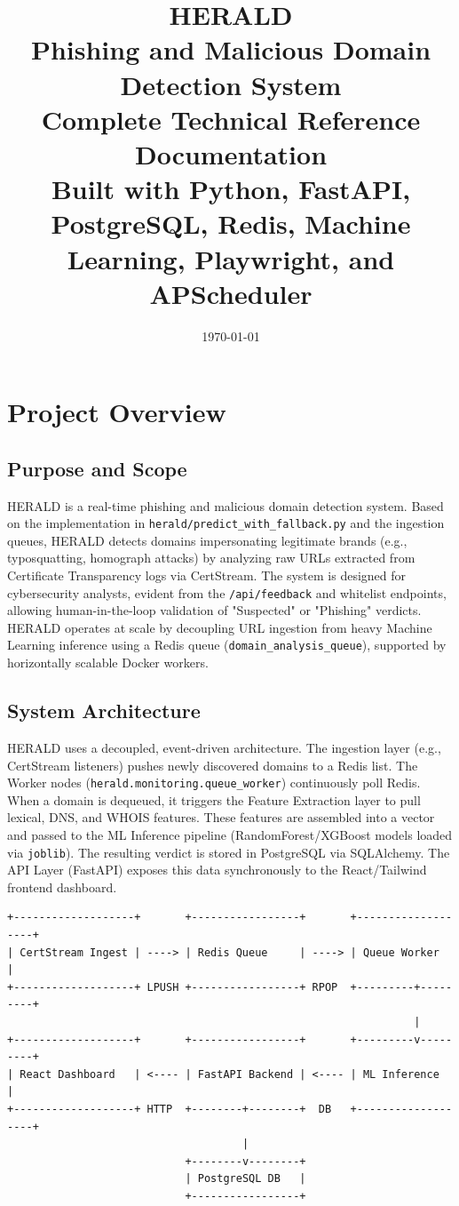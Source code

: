 \documentclass[12pt,a4paper]{report}
\title{
  \vspace{2cm}
  \textbf{\Huge HERALD} \\
  \vspace{0.5cm}
  \Large Phishing and Malicious Domain Detection System \\
  \vspace{0.3cm}
  \large Complete Technical Reference Documentation \\
  \vspace{1cm}
  \normalsize Built with Python, FastAPI, PostgreSQL, Redis,
  Machine Learning, Playwright, and APScheduler
}
\date{\today}
\begin{document}
\maketitle
\newpage
\tableofcontents
\newpage

\chapter{Project Overview}
\section{Purpose and Scope}
HERALD is a real-time phishing and malicious domain detection system. Based on the implementation in \texttt{herald/predict\_with\_fallback.py} and the ingestion queues, HERALD detects domains impersonating legitimate brands (e.g., typosquatting, homograph attacks) by analyzing raw URLs extracted from Certificate Transparency logs via CertStream. The system is designed for cybersecurity analysts, evident from the \texttt{/api/feedback} and whitelist endpoints, allowing human-in-the-loop validation of "Suspected" or "Phishing" verdicts. HERALD operates at scale by decoupling URL ingestion from heavy Machine Learning inference using a Redis queue (\texttt{domain\_analysis\_queue}), supported by horizontally scalable Docker workers.

\section{System Architecture}
HERALD uses a decoupled, event-driven architecture. The ingestion layer (e.g., CertStream listeners) pushes newly discovered domains to a Redis list. The Worker nodes (\texttt{herald.monitoring.queue\_worker}) continuously poll Redis. When a domain is dequeued, it triggers the Feature Extraction layer to pull lexical, DNS, and WHOIS features. These features are assembled into a vector and passed to the ML Inference pipeline (RandomForest/XGBoost models loaded via \texttt{joblib}). The resulting verdict is stored in PostgreSQL via SQLAlchemy. The API Layer (FastAPI) exposes this data synchronously to the React/Tailwind frontend dashboard.

\begin{verbatim}
+-------------------+       +-----------------+       +-------------------+
| CertStream Ingest | ----> | Redis Queue     | ----> | Queue Worker      |
+-------------------+ LPUSH +-----------------+ RPOP  +---------+---------+
                                                                |
+-------------------+       +-----------------+       +---------v---------+
| React Dashboard   | <---- | FastAPI Backend | <---- | ML Inference      |
+-------------------+ HTTP  +--------+--------+  DB   +-------------------+
                                     |
                            +--------v--------+
                            | PostgreSQL DB   |
                            +-----------------+
\end{verbatim}
\end{document}
